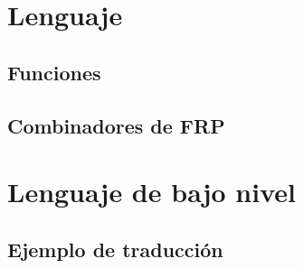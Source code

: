 

\section{Lenguaje \frob{}}


  \subsection{Funciones}
  
  \subsection{Combinadores de FRP}
  

\section{Lenguaje de bajo nivel}


\subsection{Ejemplo de traducción}


